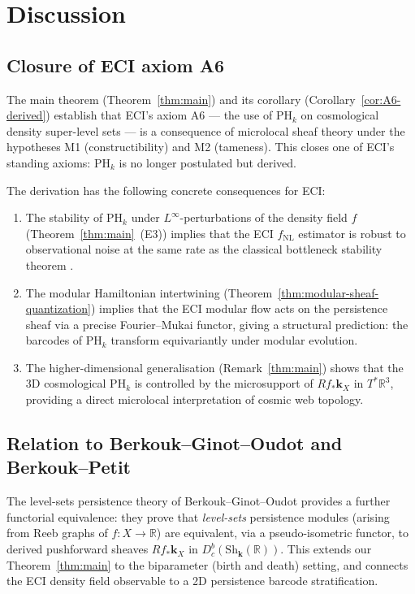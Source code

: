 \documentclass[12pt,a4paper]{amsart}
\theoremstyle{definition}
\newcommand{\R}{\mathbb{R}}
\newcommand{\kk}{\mathbf{k}}                %
\newcommand{\Sh}{\mathrm{Sh}}               %
\newcommand{\Dbc}{D^b_c}                     %
\newcommand{\PHk}{\mathrm{PH}_k}            %
\begin{document}
\section{Discussion}
\label{sec:discussion}

\subsection{Closure of ECI axiom A6}

The main theorem (Theorem~\ref{thm:main}) and its corollary
(Corollary~\ref{cor:A6-derived}) establish that ECI's axiom A6 ---
the use of $\PHk$ on cosmological density super-level sets --- is a
consequence of microlocal sheaf theory under the hypotheses M1
(constructibility) and M2 (tameness).  This closes one of ECI's
standing axioms: $\PHk$ is no longer postulated but derived.

The derivation has the following concrete consequences for ECI:
\begin{enumerate}
  \item[(i)]
    The stability of $\PHk$ under $L^\infty$-perturbations of the
    density field $f$ (Theorem~\ref{thm:main}~(E3)) implies that the
    ECI $f_\mathrm{NL}$ estimator is robust to observational noise at
    the same rate as the classical bottleneck stability theorem
    \cite{CSGO2016}.
  \item[(ii)]
    The modular Hamiltonian intertwining
    (Theorem~\ref{thm:modular-sheaf-quantization}) implies that the
    ECI modular flow acts on the persistence sheaf via a precise
    Fourier--Mukai functor, giving a structural prediction: the barcodes
    of $\PHk$ transform equivariantly under modular evolution.
  \item[(iii)]
    The higher-dimensional generalisation (Remark~\ref{thm:main}) shows
    that the 3D cosmological $\PHk$ is controlled by the microsupport of
    $Rf_*\kk_X$ in $T^*\R^3$, providing a direct microlocal
    interpretation of cosmic web topology.
\end{enumerate}

\subsection{Relation to Berkouk--Ginot--Oudot and Berkouk--Petit}

The level-sets persistence theory of Berkouk--Ginot--Oudot
\cite{BGO2019} provides a further functorial equivalence: they prove
that \emph{level-sets} persistence modules (arising from Reeb graphs of
$f: X \to \R$) are equivalent, via a pseudo-isometric functor, to
derived pushforward sheaves $Rf_*\kk_X$ in $\Dbc(\Sh_\kk(\R))$.  This
extends our Theorem~\ref{thm:main} to the biparameter (birth and
death) setting, and connects the ECI density field observable to a 2D
persistence barcode stratification.
\end{document}
